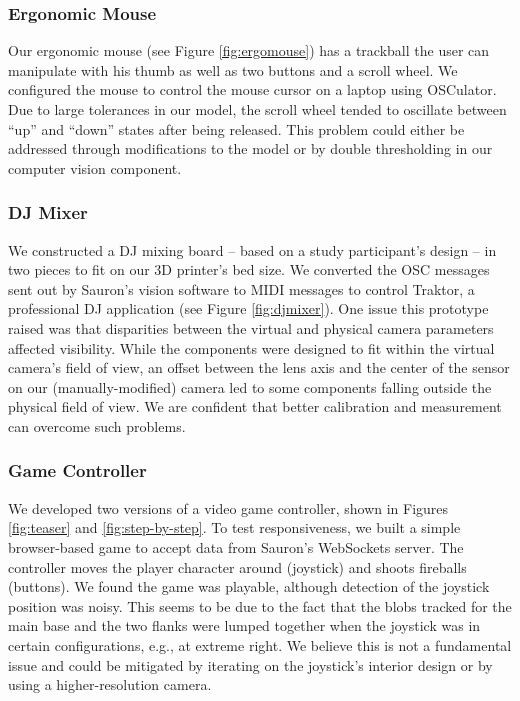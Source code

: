         \subsubsection{Ergonomic Mouse}
        Our ergonomic mouse (see Figure \ref{fig:ergomouse}) has a trackball the user can manipulate with his thumb as well as two buttons and a scroll wheel. We configured the mouse to control the mouse cursor on a laptop using OSCulator. Due to large tolerances in our model, the scroll wheel tended to oscillate between ``up'' and ``down'' states after being released. This problem could either be addressed through modifications to the model or by double thresholding in our computer vision component.


        \subsubsection{DJ Mixer}
        We constructed a DJ mixing board -- based on a study participant's design -- in two pieces to fit on our 3D printer's bed size. We converted the OSC messages sent out by Sauron's vision software to MIDI messages to control Traktor, a professional DJ application (see Figure \ref{fig:djmixer}). One issue this prototype raised was that disparities between the virtual and physical camera parameters affected visibility. While the components were designed to fit within the virtual camera's field of view, an offset between the lens axis and the center of the sensor on our (manually-modified) camera led to some components falling outside the physical field of view. We are confident that better calibration and measurement can overcome such problems.
        
        \subsubsection{Game Controller}
        We developed two versions of a video game controller, shown in Figures \ref{fig:teaser} and \ref{fig:step-by-step}. To test responsiveness, we built a simple browser-based game to accept data from Sauron's WebSockets server. The controller moves the player character around (joystick) and shoots fireballs (buttons). We found the game was playable, although detection of the joystick position was noisy. This seems to be due to the fact that the blobs tracked for the main base and the two flanks were lumped together when the joystick was in certain configurations, e.g., at extreme right. We believe this is not a fundamental issue and could be mitigated by iterating on the joystick's interior design or by using a higher-resolution camera.

